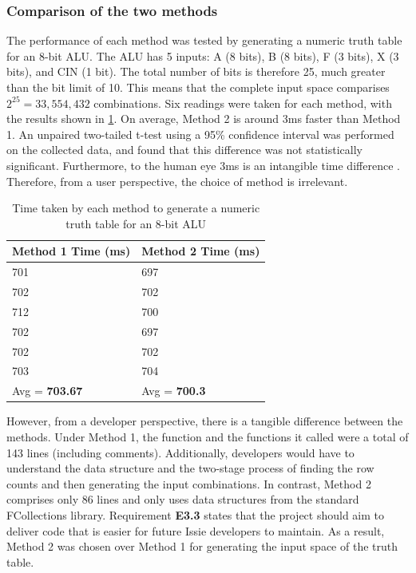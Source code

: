 \subsubsection{Comparison of the two methods}
The performance of each method was tested by generating a numeric truth table for an 8-bit ALU. The ALU has 5 inputs: A (8 bits), B (8 bits), F (3 bits), X (3 bits), and CIN (1 bit). The total number of bits is therefore 25, much greater than the bit limit of 10. This means that the complete input space comparises $2^{25} = 33,554,432$ combinations. Six readings were taken for each method, with the results shown in \ref{tab:ttGenPerformance}. On average, Method 2 is around 3ms faster than Method 1. An unpaired two-tailed t-test using a 95\% confidence interval was performed on the collected data, and found that this difference was not statistically significant. Furthermore, to the human eye 3ms is an intangible time difference \cite{Miller1968ResponseTI}. Therefore, from a user perspective, the choice of method is irrelevant.

\begin{table}[!ht]
    \centering
    \begin{tabular}{|l|l|}
    \hline
        Method 1 Time (ms) & Method 2 Time (ms) \\ \hline
        701 & 697 \\ \hline
        702 & 702 \\ \hline
        712 & 700 \\ \hline
        702 & 697 \\ \hline
        702 & 702 \\ \hline
        703 & 704 \\ \hline
        Avg = \textbf{703.67} & Avg = \textbf{700.3} \\ \hline
    \end{tabular}
    \caption{Time taken by each method to generate a numeric truth table for an 8-bit ALU}
    \label{tab:ttGenPerformance}
\end{table}

However, from a developer perspective, there is a tangible difference between the methods. Under Method 1, the  function and the functions it called were a total of 143 lines (including comments). Additionally, developers would have to understand the  data structure and the two-stage process of finding the row counts and then generating the input combinations. In contrast, Method 2 comprises only 86 lines and only uses data structures from the standard F\fsharp Collections library. Requirement \textbf{E3.3} states that the project should aim to deliver code that is easier for future Issie developers to maintain. As a result, Method 2 was chosen over Method 1 for generating the input space of the truth table.

